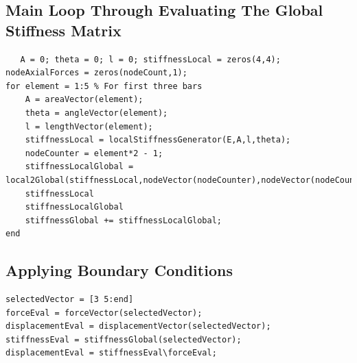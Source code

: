 \documentclass{report}
\begin{document}
\subsection{Main Loop Through Evaluating The Global Stiffness Matrix}
\begin{verbatim}
   A = 0; theta = 0; l = 0; stiffnessLocal = zeros(4,4); nodeAxialForces = zeros(nodeCount,1);
for element = 1:5 % For first three bars
    A = areaVector(element);
    theta = angleVector(element);
    l = lengthVector(element);
    stiffnessLocal = localStiffnessGenerator(E,A,l,theta);
    nodeCounter = element*2 - 1;
    stiffnessLocalGlobal = local2Global(stiffnessLocal,nodeVector(nodeCounter),nodeVector(nodeCounter+1),nodeCount);
    stiffnessLocal
    stiffnessLocalGlobal
    stiffnessGlobal += stiffnessLocalGlobal;
end
\end{verbatim}
\subsection{Applying Boundary Conditions}
\begin{verbatim}
selectedVector = [3 5:end]
forceEval = forceVector(selectedVector);
displacementEval = displacementVector(selectedVector);
stiffnessEval = stiffnessGlobal(selectedVector);
displacementEval = stiffnessEval\forceEval;
\end{verbatim}
\end{document}
